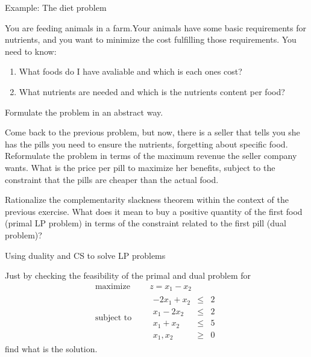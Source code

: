 \documentclass[c]{beamer}
\begin{document}
\begin{frame}[allowframebreaks]{Example: The diet problem}

  \begin{Exercise}
    You are feeding animals in a farm.Your animals have some basic requirements for nutrients, and you want to minimize the cost fulfilling those requirements. You need to know:
    \begin{enumerate}
      \item What foods do I have avaliable and which is each ones cost?
      \item What nutrients are needed and which is the nutrients content per food?
    \end{enumerate}
    Formulate the problem in an abstract way.
  \end{Exercise}
  \begin{Exercise}
    Come back to the previous problem, but now, there is a seller that tells you she has the pills you need to ensure the nutrients, forgetting about specific food. Reformulate the problem in terms of the maximum revenue the seller company wants. What is the price per pill to maximize her benefits, subject to the constraint that the pills are cheaper than the actual food.
  \end{Exercise}
  \begin{Exercise}
    Rationalize the complementarity slackness theorem within the context of the previous exercise. What does it mean to buy a positive quantity of the first food (primal LP problem) in terms of the constraint related to the first pill (dual problem)?
  \end{Exercise}
\end{frame}
\begin{frame}{Using duality and CS to solve LP problems}
  \begin{Exercise}
    Just by checking the feasibility of the primal and dual problem for
    \begin{equation*}
      \begin{aligned}
        \text{maximize } \quad & z = x_1-x_2 \\
        \text{subject to }\quad &
        \begin{array}{rcl}
          -2x_1 +x_2 &\leq &2 \\
          x_1-2x_2 &\leq &2 \\
          x_1+x_2 &\leq &5 \\
          x_1,x_2 &\geq& 0
        \end{array}
      \end{aligned}
    \end{equation*}
    find what is the solution.
  \end{Exercise}
\end{frame}



\end{document}

